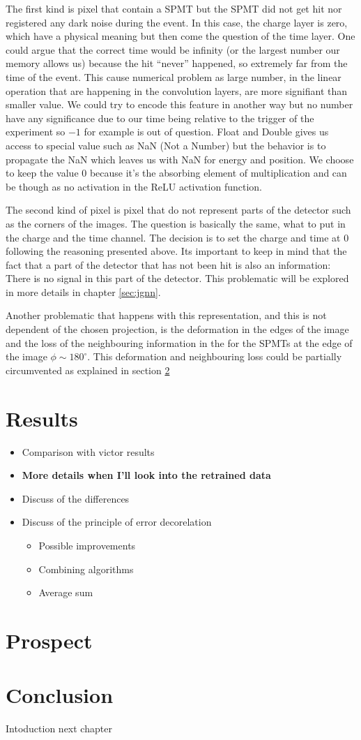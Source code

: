 The first kind is pixel that contain a SPMT but the SPMT did not get hit nor registered any dark noise during the event. In this case, the charge layer is zero, which have a physical meaning but then come the question of the time layer. One could argue that the correct time would be infinity (or the largest number our memory allows us) because the hit ``never'' happened, so extremely far from the time of the event. This cause numerical problem as large number, in the linear operation that are happening in the convolution layers, are more signifiant than smaller value. We could try to encode this feature in another way but no number have any significance due to our time being relative to the trigger of the experiment so $-1$ for example is out of question. Float and Double gives us access to special value such as NaN (Not a Number) \cite{noauthor_ieee_2019} but the behavior is to propagate the NaN which leaves us with NaN for energy and position. We choose to keep the value 0 because it's the absorbing element of multiplication and can be though as no activation in the ReLU activation function.

The second kind of pixel is pixel that do not represent parts of the detector such as the corners of the images. The question is basically the same, what to put in the charge and the time channel. The decision is to set the charge and time at 0 following the reasoning presented above. Its important to keep in mind that the fact that a part of the detector that has not been hit is also an information: There is no signal in this part of the detector. This problematic will be explored in more details in chapter \ref{sec:jgnn}.

Another problematic that happens with this representation, and this is not dependent of the chosen projection, is the deformation in the edges of the image and the loss of the neighbouring information in the for the SPMTs at the edge of the image $\phi \sim 180^\circ$. This deformation and neighbouring loss could be partially circumvented as explained in section \ref{sec:jcnn:prospect}
\section{Results}

\begin{itemize}
  \item Comparison with victor results
  \item \textbf{More details when I'll look into the retrained data}
  \item Discuss of the differences
  \item Discuss of the principle of error decorelation
    \begin{itemize}
      \item Possible improvements
      \item Combining algorithms
      \item Average sum
    \end{itemize}
\end{itemize}

\section{Prospect}
\label{sec:jcnn:prospect}

\section{Conclusion}
Intoduction next chapter
